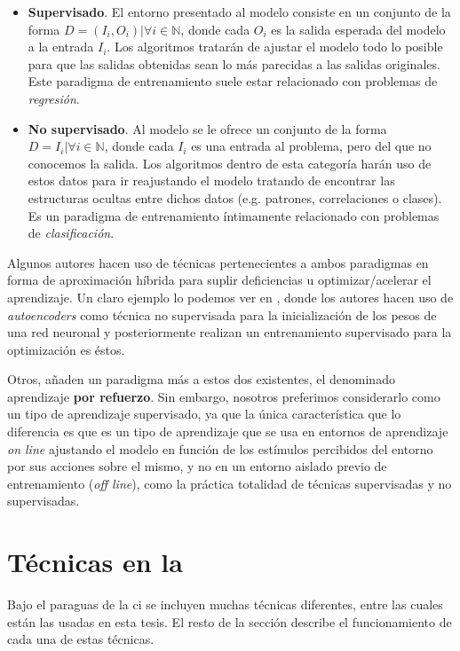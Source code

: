 \begin{itemize}
	\item \textbf{Supervisado}. El entorno presentado al modelo consiste en un conjunto de la forma $D = {(I_i, O_i) | \forall i \in \mathbb{N}}$, donde cada $O_i$ es la salida esperada del modelo a la entrada $I_i$. Los algoritmos tratarán de ajustar el modelo todo lo posible para que las salidas obtenidas sean lo más parecidas a las salidas originales. Este paradigma de entrenamiento suele estar relacionado con problemas de \textit{regresión}.
	\item \textbf{No supervisado}. Al modelo se le ofrece un conjunto de la forma $D = {I_i | \forall i \in \mathbb{N}}$, donde cada $I_i$ es una entrada al problema, pero del que no conocemos la salida. Los algoritmos dentro de esta categoría harán uso de estos datos para ir reajustando el modelo tratando de encontrar las estructuras ocultas entre dichos datos (e.g. patrones, correlaciones o clases). Es un paradigma de entrenamiento íntimamente relacionado con problemas de \textit{clasificación}.
\end{itemize}

Algunos autores hacen uso de técnicas pertenecientes a ambos paradigmas en forma de aproximación híbrida para suplir deficiencias u optimizar/acelerar el aprendizaje. Un claro ejemplo lo podemos ver en \cite{Hinton2006}, donde los autores hacen uso de \textit{autoencoders} como técnica no supervisada para la inicialización de los pesos de una red neuronal y posteriormente realizan un entrenamiento supervisado para la optimización es éstos.

Otros, añaden un paradigma más a estos dos existentes, el denominado aprendizaje \textbf{por refuerzo}. Sin embargo, nosotros preferimos considerarlo como un tipo de aprendizaje supervisado, ya que la única característica que lo diferencia es que es un tipo de aprendizaje que se usa en entornos de aprendizaje \textit{on line} ajustando el modelo en función de los estímulos percibidos del entorno por sus acciones sobre el mismo, y no en un entorno aislado previo de entrenamiento (\textit{off line}), como la práctica totalidad de técnicas supervisadas y no supervisadas.

\section{Técnicas en la }

Bajo el paraguas de la \ac{ci} se incluyen muchas técnicas diferentes, entre las cuales están las usadas en esta tesis. El resto de la sección describe el funcionamiento de cada una de estas técnicas.

